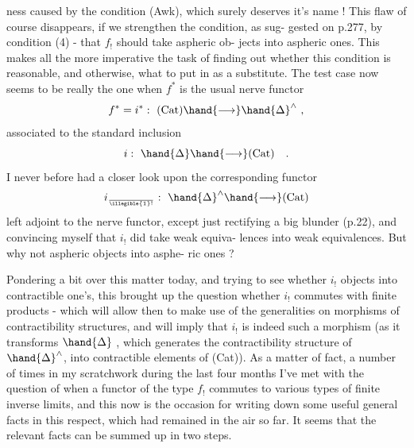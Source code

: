 
ness caused by the condition (Awk),  which surely deserves it's name !
This flaw of course disappears,  if we strengthen the condition,  as sug-%
gested on p.277,  by condition (4)  -  that $f_!$ should take aspheric ob-%
jects into aspheric ones.  This makes all the more imperative the task of
finding out whether this condition is reasonable,  and otherwise, what to
put in as a substitute.  %
The test case now seems to be really the one when
$f^*$ is the usual nerve functor
\[ f^* = i^* :\ (\mathrm{Cat}) \hand{\longrightarrow} \hand{\Delta}^{\wedge} \ , \]
associated to the standard inclusion
\[ i :\ \hand{\Delta} \hand{\longrightarrow} (\mathrm{Cat}) \quad . \]
I never before had a closer look upon the corresponding functor
\[ i_{\over{\illegible{1}}{!}} :\ \hand{\Delta}^{\wedge} \hand{\longrightarrow} (\mathrm{Cat}) \]
left adjoint to the nerve functor,  except just  rectifying a big
blunder (p.22),  and convincing myself that $i_!$ did \hand{\uline{\textcolor{black}{not}}} take weak equiva-%
lences into weak equivalences.  But why not aspheric objects into asphe-%
ric ones ?

Pondering a bit over this matter today,  and trying to see whether
$i_!$   \hand{\uline{\textcolor{black}{contractible}}} objects into contractible one's,  this brought up
the question whether $i_!$ commutes with finite products -  which will allow
then to make use of the generalities on morphisms of contractibility
structures,  and will imply that $i_!$  is indeed such a morphism (as it
transforms $\hand{\Delta}$ ,  which generates the contractibility structure of $\hand{\Delta}^{\wedge}$,
into contractible elements of (Cat)).  As a matter of fact,  a number of
times in my scratchwork during the last four months I've met with the
question of when a functor of the type $f_!$ commutes to various types of
finite inverse limits,  and this now is the occasion for writing down
some useful general facts in this respect,  which had remained  in the air
so far.  It seems that the relevant facts can be summed up in two steps.

